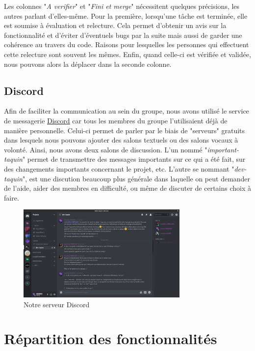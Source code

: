 			Les colonnes "\textit{A verifier}" et "\textit{Fini et merge}" nécessitent quelques précisions, les autres parlant d'elles-même. Pour la première, lorsqu'une tâche est terminée, elle est soumise à évaluation et relecture. Cela permet d'obtenir un avis sur la fonctionnalité et d'éviter d'éventuels bugs par la suite mais aussi de garder une cohérence au travers du code. Raisons pour lesquelles les personnes qui effectuent cette relecture sont souvent les mêmes. Enfin, quand celle-ci est vérifiée et validée, nous pouvons alors la déplacer dans la seconde colonne.

		\subsection{Discord}

			Afin de faciliter la communication au sein du groupe, nous avons utilisé le service de messagerie \href{https://discordapp.com}{Discord} car tous les membres du groupe l'utilisaient déjà de manière personnelle. Celui-ci permet de parler par le biais de "serveurs" gratuits dans lesquels nous pouvons ajouter des salons textuels ou des salons vocaux à volonté. Ainsi, nous avons deux salons de discussion. L'un nommé "\textit{important-taquin}" permet de transmettre des messages importants sur ce qui a été fait, sur des changements importants concernant le projet, etc. L'autre se nommant "\textit{dev-taquin}", est une discution beaucoup plus générale dans laquelle on peut demander de l'aide, aider des membres en difficulté, ou même de discuter de certains choix à faire.

			\begin{figure}[H]
				\centering\includegraphics[width=0.75\textwidth, keepaspectratio]{img/discord.png}
				\caption{Notre serveur Discord}
			\end{figure}

	\section{Répartition des fonctionnalités}

